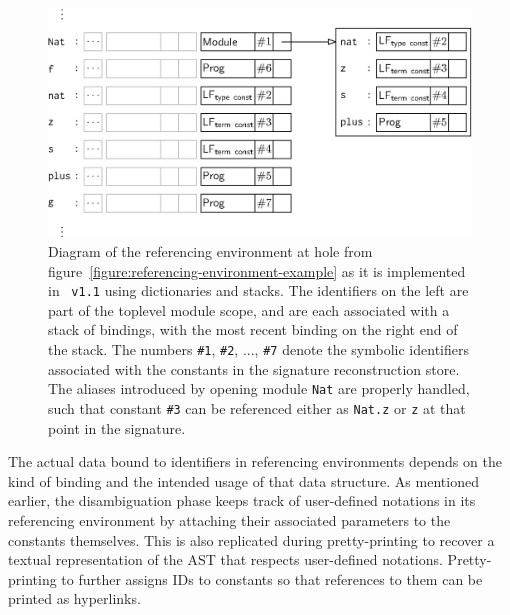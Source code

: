 \begin{figure}[htb]
\centering
\includegraphics{figures/referencing-environment-implementation.eps}
\caption[Example referencing environment in the implementation]{%
Diagram of the referencing environment at hole \texttt{} from figure~\ref{figure:referencing-environment-example} as it is implemented in \Beluga~\texttt{v1.1} using dictionaries and stacks.
The identifiers on the left are part of the toplevel module scope, and are each associated with a stack of bindings, with the most recent binding on the right end of the stack.
The numbers \texttt{\#1}, \texttt{\#2}, ..., \texttt{\#7} denote the symbolic identifiers associated with the constants in the signature reconstruction store.
The aliases introduced by opening module \texttt{Nat} are properly handled, such that constant \texttt{\#3} can be referenced either as \texttt{Nat.z} or \texttt{z} at that point in the signature.
}
\label{figure:referencing-environment-implementation}
\end{figure}

The actual data bound to identifiers in referencing environments depends on the kind of binding and the intended usage of that data structure.
As mentioned earlier, the disambiguation phase keeps track of user-defined notations in its referencing environment by attaching their associated parameters to the constants themselves.
This is also replicated during pretty-printing to recover a textual representation of the \ac{AST} that respects user-defined notations.
Pretty-printing to \HTML further assigns IDs to constants so that references to them can be printed as hyperlinks.

